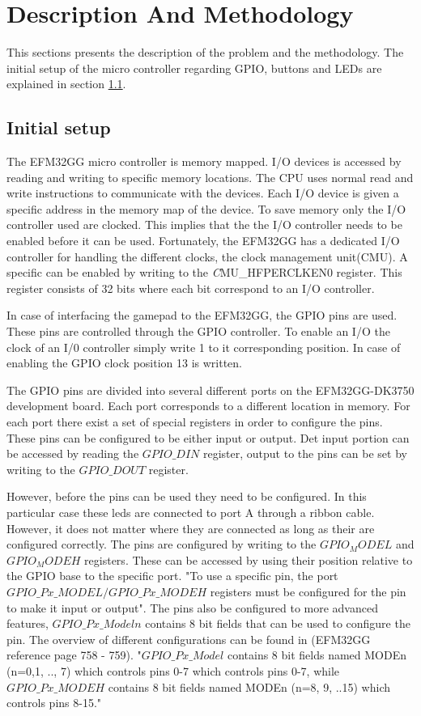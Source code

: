 \section{Description And Methodology}
This sections presents the description of the problem and the methodology. The initial setup of the micro controller regarding GPIO, buttons and LEDs are explained in section \ref{ch:initial_setup}. 


\subsection{Initial setup} \label{ch:initial_setup}
The EFM32GG micro controller is memory mapped. I/O devices is accessed by reading and writing to specific memory locations. The CPU uses normal read and write instructions to communicate with the devices. Each I/O device is given a specific address in the memory map of the device. To save memory only the I/O controller used are clocked. This implies that the the I/O controller needs to be enabled before it can be used. Fortunately, the EFM32GG has a dedicated I/O controller for handling the different clocks, the clock management unit(CMU). A specific can be enabled by writing to the \emph CMU\_HFPERCLKEN0 register. This register consists of 32 bits where each bit correspond to an I/O controller. 

In case of interfacing the gamepad to the EFM32GG, the GPIO pins are used. These pins are controlled through the GPIO controller. To enable an I/O the clock of an I/0 controller simply write 1 to it corresponding position. In case of enabling the GPIO clock position 13 is written. 

The GPIO pins are divided into several different ports on the EFM32GG-DK3750 development board. Each port corresponds to a different location in memory. For each port there exist a set of special registers in order to configure the pins. These pins can be configured to be either input or output. Det input portion can be accessed by reading the $GPIO\_DIN$ register, output to the pins can be set by writing to the $GPIO\_DOUT$ register. 

However, before the pins can be used they need to be configured. In this particular case these leds are connected to port A through a ribbon cable. However, it does not matter where they are connected as long as their are configured correctly. The pins are configured by writing to the $GPIO_MODEL$ and $GPIO_MODEH$ registers. These can be accessed by using their position relative to the GPIO base to the specific port. "To use a specific pin, the port $GPIO\_Px\_MODEL/GPIO\_Px\_MODEH$ registers must be configured for the pin to make it input or output". The pins also be configured to more advanced features, $GPIO\_Px\_Modeln$ contains 8 bit fields that can be used to configure the pin. The overview of different configurations can be found in (EFM32GG reference page 758 - 759). "$GPIO\_Px\_Model$ contains 8 bit fields named MODEn (n=0,1, .., 7) which controls pins 0-7 which controls pins 0-7, while $GPIO\_Px\_MODEH$ contains 8 bit fields named MODEn (n=8, 9, ..15) which controls pins 8-15."  


